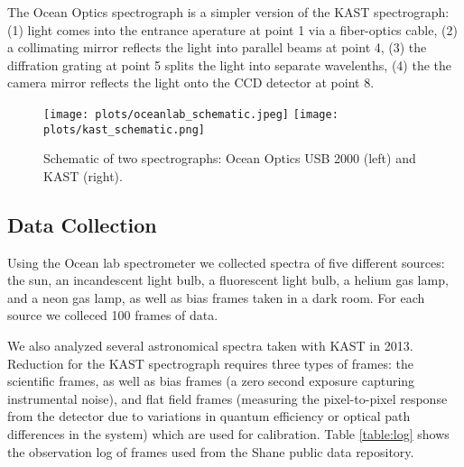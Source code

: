 \documentclass[preprint]{aastex62}
\begin{document}
The Ocean Optics spectrograph is a simpler version of the KAST spectrograph: (1) light comes into the entrance aperature at point 1 via a fiber-optics cable, (2) a collimating mirror reflects the light into parallel beams at point 4, (3) the diffration grating at point 5 splits the light into separate wavelenths, (4) the the camera mirror reflects the light onto the CCD detector at point 8.

\begin{figure}[]
\begin{center}
\texttt{[image: plots/oceanlab\_schematic.jpeg]}
\texttt{[image: plots/kast\_schematic.png]} 
\caption{Schematic of two spectrographs: Ocean Optics USB 2000 (left) and KAST (right).} \label{fig:schematic}
\end{center}
\end{figure}

\subsection{Data Collection}
Using the Ocean lab spectrometer we collected spectra of five different sources: the sun, an incandescent light bulb, a fluorescent light bulb, a helium gas lamp, and a neon gas lamp, as well as bias frames taken in a dark room. For each source we colleced 100 frames of data.

We also analyzed several astronomical spectra taken with KAST in 2013. Reduction for the KAST spectrograph requires three types of frames: the scientific frames, as well as bias frames (a zero second exposure capturing instrumental noise), and flat field frames (measuring the pixel-to-pixel
response from the detector due to variations in quantum efficiency or optical path differences in the system) which are used for calibration. Table \ref{table:log} shows the observation log of frames used from the Shane public data repository.
\end{document}
